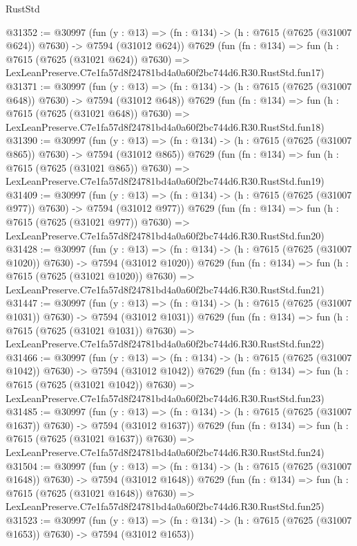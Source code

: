 \begin{lexlean}{RustStd}
\begin{coremodule}
@31352 := @30997
    (fun (y : @13) => (fn : @134) -> (h : @7615 (@7625 (@31007 @624)) @7630) -> @7594 (@31012 @624))
    @7629
    (fun (fn : @134) =>
    fun (h : @7615 (@7625 (@31021 @624)) @7630) =>
    LexLeanPreserve.C7e1fa57d8f24781bd4a0a60f2bc744d6.R30.RustStd.fun17)
@31371 := @30997
    (fun (y : @13) => (fn : @134) -> (h : @7615 (@7625 (@31007 @648)) @7630) -> @7594 (@31012 @648))
    @7629
    (fun (fn : @134) =>
    fun (h : @7615 (@7625 (@31021 @648)) @7630) =>
    LexLeanPreserve.C7e1fa57d8f24781bd4a0a60f2bc744d6.R30.RustStd.fun18)
@31390 := @30997
    (fun (y : @13) => (fn : @134) -> (h : @7615 (@7625 (@31007 @865)) @7630) -> @7594 (@31012 @865))
    @7629
    (fun (fn : @134) =>
    fun (h : @7615 (@7625 (@31021 @865)) @7630) =>
    LexLeanPreserve.C7e1fa57d8f24781bd4a0a60f2bc744d6.R30.RustStd.fun19)
@31409 := @30997
    (fun (y : @13) => (fn : @134) -> (h : @7615 (@7625 (@31007 @977)) @7630) -> @7594 (@31012 @977))
    @7629
    (fun (fn : @134) =>
    fun (h : @7615 (@7625 (@31021 @977)) @7630) =>
    LexLeanPreserve.C7e1fa57d8f24781bd4a0a60f2bc744d6.R30.RustStd.fun20)
@31428 := @30997
    (fun (y : @13) =>
    (fn : @134) -> (h : @7615 (@7625 (@31007 @1020)) @7630) -> @7594 (@31012 @1020))
    @7629
    (fun (fn : @134) =>
    fun (h : @7615 (@7625 (@31021 @1020)) @7630) =>
    LexLeanPreserve.C7e1fa57d8f24781bd4a0a60f2bc744d6.R30.RustStd.fun21)
@31447 := @30997
    (fun (y : @13) =>
    (fn : @134) -> (h : @7615 (@7625 (@31007 @1031)) @7630) -> @7594 (@31012 @1031))
    @7629
    (fun (fn : @134) =>
    fun (h : @7615 (@7625 (@31021 @1031)) @7630) =>
    LexLeanPreserve.C7e1fa57d8f24781bd4a0a60f2bc744d6.R30.RustStd.fun22)
@31466 := @30997
    (fun (y : @13) =>
    (fn : @134) -> (h : @7615 (@7625 (@31007 @1042)) @7630) -> @7594 (@31012 @1042))
    @7629
    (fun (fn : @134) =>
    fun (h : @7615 (@7625 (@31021 @1042)) @7630) =>
    LexLeanPreserve.C7e1fa57d8f24781bd4a0a60f2bc744d6.R30.RustStd.fun23)
@31485 := @30997
    (fun (y : @13) =>
    (fn : @134) -> (h : @7615 (@7625 (@31007 @1637)) @7630) -> @7594 (@31012 @1637))
    @7629
    (fun (fn : @134) =>
    fun (h : @7615 (@7625 (@31021 @1637)) @7630) =>
    LexLeanPreserve.C7e1fa57d8f24781bd4a0a60f2bc744d6.R30.RustStd.fun24)
@31504 := @30997
    (fun (y : @13) =>
    (fn : @134) -> (h : @7615 (@7625 (@31007 @1648)) @7630) -> @7594 (@31012 @1648))
    @7629
    (fun (fn : @134) =>
    fun (h : @7615 (@7625 (@31021 @1648)) @7630) =>
    LexLeanPreserve.C7e1fa57d8f24781bd4a0a60f2bc744d6.R30.RustStd.fun25)
@31523 := @30997
    (fun (y : @13) =>
    (fn : @134) -> (h : @7615 (@7625 (@31007 @1653)) @7630) -> @7594 (@31012 @1653))

\end{coremodule}
\end{lexlean}
